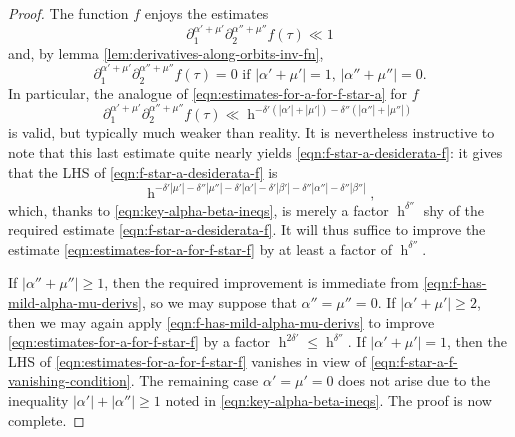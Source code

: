 \documentclass[reqno]{amsart}
\DeclareMathOperator{\h}{h}
\theoremstyle{plain} \newtheorem{theorem} {Theorem}
\theoremstyle{definition} \newtheorem{definition} [theorem] {Definition}
\theoremstyle{itplain} %
\numberwithin{equation}{section}
\numberwithin{theorem}{section}
\renewcommand{\geq}{\geqslant}
\renewcommand{\leq}{\leqslant}
\begin{document}
\begin{proof}
  The function $f$ enjoys the estimates
  \begin{equation}\label{eqn:f-has-mild-alpha-mu-derivs}
    \partial_{1}^{\alpha ' + \mu '} \partial_2^{\alpha '' + \mu ''} f(\tau)
    \ll 1
  \end{equation}
  and, by lemma \ref{lem:derivatives-along-orbits-inv-fn},
  \begin{equation}\label{eqn:f-star-a-f-vanishing-condition}
    \partial_{1}^{\alpha ' + \mu '} \partial_2^{\alpha '' + \mu ''} f(\tau)
    = 0 \text{ if } |\alpha ' + \mu '| = 1, \, |\alpha '' + \mu ''| = 0.
  \end{equation}
  In particular, the analogue of \eqref{eqn:estimates-for-a-for-f-star-a} for $f$
  \begin{equation}\label{eqn:estimates-for-a-for-f-star-f}
    \partial_{1}^{\alpha ' + \mu '} \partial_2^{\alpha '' + \mu ''} f(\tau)
    \ll
    \h^{- \delta '( |\alpha '| +  |\mu '|) - \delta ''(|\alpha ''| + |\mu ''|)}
  \end{equation}
  is valid, but typically much weaker than reality.  It is nevertheless instructive to note that this last estimate quite nearly yields \eqref{eqn:f-star-a-desiderata-f}: it gives that the LHS of \eqref{eqn:f-star-a-desiderata-f} is
  \[
    \h^{- \delta ' |\mu '| - \delta '' | \mu ''| - \delta ' |\alpha '| - \delta ' |\beta '| - \delta '' | \alpha '' | - \delta '' |\beta ''| },
  \]
  which, thanks to \eqref{eqn:key-alpha-beta-ineqs}, is merely a factor $\h^{\delta ''}$ shy of the required estimate \eqref{eqn:f-star-a-desiderata-f}.  It will thus suffice to improve the estimate \eqref{eqn:estimates-for-a-for-f-star-f} by at least a factor of $\h^{\delta ''}$.

  If $|\alpha '' + \mu ''| \geq 1$, then the required improvement is immediate from \eqref{eqn:f-has-mild-alpha-mu-derivs}, so we may suppose that $\alpha '' = \mu '' = 0$.  If $|\alpha ' + \mu '| \geq 2$, then we may again apply \eqref{eqn:f-has-mild-alpha-mu-derivs} to improve \eqref{eqn:estimates-for-a-for-f-star-f} by a factor $\h^{2 \delta '} \leq \h^{\delta ''}$.  If $|\alpha ' + \mu '| = 1$, then the LHS of \eqref{eqn:estimates-for-a-for-f-star-f} vanishes in view of \eqref{eqn:f-star-a-f-vanishing-condition}.  The remaining case $\alpha ' = \mu ' = 0$ does not arise due to the inequality $|\alpha '| + |\alpha ''| \geq 1$ noted in \eqref{eqn:key-alpha-beta-ineqs}.  The proof is now complete.
\end{proof}
  
\end{document}

